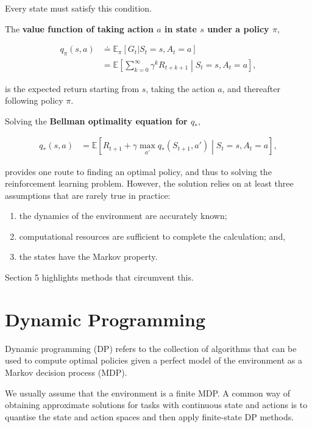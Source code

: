 \documentclass{article}
\begin{document}
Every state must satisfy this condition.

The \textbf{value function of taking action \(a\) in state \(s\) under a policy \(\pi\)},

\[
\begin{aligned}
q_\pi(s, a) & \doteq \mathbb{E}_\pi[G_t | S_t = s, A_t = a] \\
& = \mathbb{E} \left[ \sum_{k=0}^{\infty}\gamma^k R_{t+k+1} \middle| S_t = s, A_t = a \right],
\end{aligned}
\]

is the expected return starting from \(s\), taking the action \(a\), and
thereafter following policy \(\pi\).

Solving the \textbf{Bellman optimality equation for \(q_*\)},

\[\begin{aligned} 
q_*(s,a) & = \mathbb{E} \left[ R_{t+1} + \gamma \max_{a'} q_*(S_{t+1},a') \middle| S_t=s, A_t=a \right], 
\end{aligned}\]

provides one route to finding an optimal policy, and thus to solving the reinforcement learning problem. However, the solution relies on at
least three assumptions that are rarely true in practice:

\begin{enumerate}
\def\labelenumi{\arabic{enumi}.}
\item
  the dynamics of the environment are accurately known;
\item
  computational resources are sufficient to complete the calculation; and,
\item
  the states have the Markov property.
\end{enumerate}

Section 5 highlights methods that circumvent this.

\section{Dynamic Programming}

Dynamic programming (DP) refers to the collection of algorithms
that can be used to compute optimal policies given a perfect model of
the environment as a Markov decision process (MDP).

We usually assume that the environment is a finite MDP. A common way of
obtaining approximate solutions for tasks with continuous state and
actions is to quantise the state and action spaces and then apply
finite-state DP methods.
\end{document}

